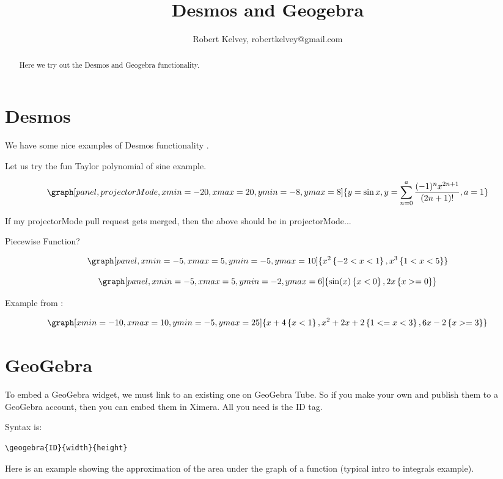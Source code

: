 \documentclass{ximera}
\title{Desmos and Geogebra}
\author{Robert Kelvey, robertkelvey@gmail.com}
\begin{document}
\begin{abstract}
Here we try out the Desmos and Geogebra functionality.
\end{abstract}
\maketitle

\section{Desmos}

We have some nice examples of Desmos functionality . 

Let us try the fun Taylor polynomial of sine example.

\[
    \graph[panel, projectorMode, xmin=-20, xmax=20, ymin=-8, ymax=8]{y=\sin x, y=\sum _{n=0}^a\frac{(-1)^n x^{2n+1}}{(2n+1)!}, a=1}
\]

If my projectorMode pull request gets merged, then the above should be in projectorMode...


Piecewise Function?

\[
    \graph[panel,xmin=-5, xmax=5, ymin=-5, ymax=10]{ x^2\left\{-2 < x < 1 \right\}, x^3 \left\{1<x<5\right\}}
\]

\[
    \graph[panel,xmin=-5, xmax=5, ymin=-2, ymax=6]{ \sin(x)\left\{x<0\right\}, 2x\left\{ x>=0 \right\} }
\]

Example from :

\[
       \graph[xmin=-10, xmax=10, ymin=-5, ymax=25]{ x+4\left\{x<1\right\}, x^2+2x+2\left\{1<= x < 3\right\}, 6x-2\left\{x>=3\right\} }
\]


\section{GeoGebra}

To embed a GeoGebra widget, we must link to an existing one on GeoGebra Tube. So if you make your own and publish them to a GeoGebra account, then you can embed them in Ximera. All you need is the ID tag.

Syntax is: \begin{verbatim}\geogebra{ID}{width}{height} \end{verbatim}

Here is an example showing the approximation of the area under the graph of a function (typical intro to integrals example).

\end{document}
